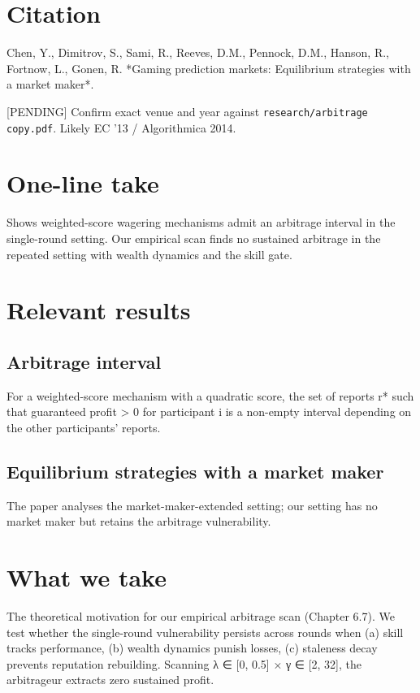 \documentclass[11pt,a4paper,openany]{report}
\begin{document}
\section{Citation}

Chen, Y., Dimitrov, S., Sami, R., Reeves, D.M., Pennock, D.M.,
Hanson, R., Fortnow, L., Gonen, R. *Gaming prediction markets:
Equilibrium strategies with a market maker*.

[PENDING] Confirm exact venue and year against
\texttt{research/arbitrage copy.pdf}. Likely EC '13 / Algorithmica 2014.

\section{One-line take}

Shows weighted-score wagering mechanisms admit an arbitrage interval
in the single-round setting. Our empirical scan finds no sustained
arbitrage in the repeated setting with wealth dynamics and the skill
gate.

\section{Relevant results}

\subsection{Arbitrage interval}

For a weighted-score mechanism with a quadratic score, the set of
reports r* such that guaranteed profit > 0 for participant i is a
non-empty interval depending on the other participants' reports.

\subsection{Equilibrium strategies with a market maker}

The paper analyses the market-maker-extended setting; our setting has
no market maker but retains the arbitrage vulnerability.

\section{What we take}

The theoretical motivation for our empirical arbitrage scan
(Chapter 6.7). We test whether the single-round vulnerability persists
across rounds when (a) skill tracks performance, (b) wealth dynamics
punish losses, (c) staleness decay prevents reputation rebuilding.
Scanning λ ∈ [0, 0.5] × γ ∈ [2, 32], the arbitrageur extracts zero
sustained profit.
\end{document}
